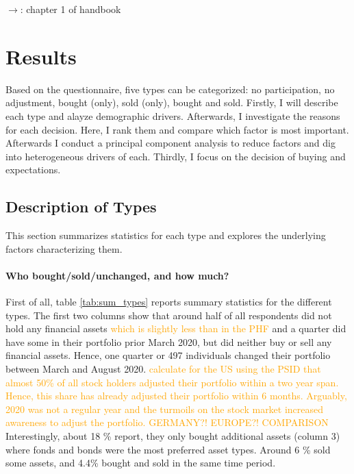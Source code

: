 \documentclass[ProjectABM]{subfiles}
\begin{document}
$\rightarrow$: chapter 1 of handbook

\section{Results}\label{sec:results}
Based on the questionnaire, five types can be categorized: no participation, no adjustment, bought (only), sold (only), bought and sold. Firstly, I will describe each type and alayze demographic drivers. Afterwards, I investigate the reasons for each decision. Here, I rank them and compare which factor is most important. Afterwards I conduct a principal component analysis to reduce factors and dig into heterogeneous drivers of each. Thirdly, I focus on the decision of buying and expectations. 

\subsection{Description of Types}\label{sec:des_types}
This section summarizes statistics for each type and explores the underlying factors characterizing them.

\paragraph{Who bought/sold/unchanged, and how much?}
First of all, table \ref{tab:sum_types} reports summary statistics for the different types.%
The first two columns show that around half of all respondents did not hold any financial assets \textcolor{orange}{which is slightly less than in the PHF} and a quarter did have some in their portfolio prior March 2020, but did neither buy or sell any financial assets. Hence, one quarter or 497 individuals changed their portfolio between March and August 2020. \textcolor{orange}{\cite{bonaparte_et_al_2012adjustment} calculate for the US using the PSID that almost 50\% of all stock holders adjusted their portfolio within a two year span. Hence, this share has already adjusted their portfolio within 6 months. Arguably, 2020 was not a regular year and the turmoils on the stock market increased awareness to adjust the portfolio. GERMANY?! EUROPE?! COMPARISON} Interestingly, about 18 \% report, they only bought additional assets (column 3) where fonds and bonds were the most preferred asset types. Around 6 \% sold some assets, and 4.4\% bought and sold in the same time period.
\end{document}
